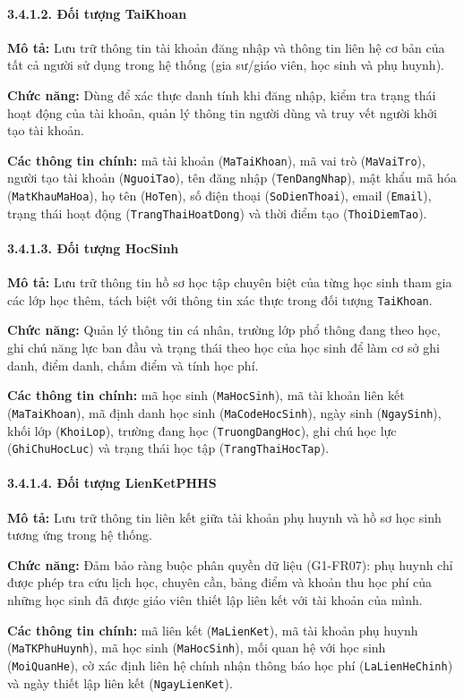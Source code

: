\paragraph{3.4.1.2. Đối tượng TaiKhoan}\mbox{}\par
\textbf{Mô tả:} Lưu trữ thông tin tài khoản đăng nhập và thông tin liên hệ cơ bản của tất cả người sử dụng trong hệ thống (gia sư/giáo viên, học sinh và phụ huynh).\par
\textbf{Chức năng:} Dùng để xác thực danh tính khi đăng nhập, kiểm tra trạng thái hoạt động của tài khoản, quản lý thông tin người dùng và truy vết người khởi tạo tài khoản.\par
\textbf{Các thông tin chính:} mã tài khoản (\texttt{MaTaiKhoan}), mã vai trò (\texttt{MaVaiTro}), người tạo tài khoản (\texttt{NguoiTao}), tên đăng nhập (\texttt{TenDangNhap}), mật khẩu mã hóa (\texttt{MatKhauMaHoa}), họ tên (\texttt{HoTen}), số điện thoại (\texttt{SoDienThoai}), email (\texttt{Email}), trạng thái hoạt động (\texttt{TrangThaiHoatDong}) và thời điểm tạo (\texttt{ThoiDiemTao}).

\paragraph{3.4.1.3. Đối tượng HocSinh}\mbox{}\par
\textbf{Mô tả:} Lưu trữ thông tin hồ sơ học tập chuyên biệt của từng học sinh tham gia các lớp học thêm, tách biệt với thông tin xác thực trong đối tượng \texttt{TaiKhoan}.\par
\textbf{Chức năng:} Quản lý thông tin cá nhân, trường lớp phổ thông đang theo học, ghi chú năng lực ban đầu và trạng thái theo học của học sinh để làm cơ sở ghi danh, điểm danh, chấm điểm và tính học phí.\par
\textbf{Các thông tin chính:} mã học sinh (\texttt{MaHocSinh}), mã tài khoản liên kết (\texttt{MaTaiKhoan}), mã định danh học sinh (\texttt{MaCodeHocSinh}), ngày sinh (\texttt{NgaySinh}), khối lớp (\texttt{KhoiLop}), trường đang học (\texttt{TruongDangHoc}), ghi chú học lực (\texttt{GhiChuHocLuc}) và trạng thái học tập (\texttt{TrangThaiHocTap}).

\paragraph{3.4.1.4. Đối tượng LienKetPHHS}\mbox{}\par
\textbf{Mô tả:} Lưu trữ thông tin liên kết giữa tài khoản phụ huynh và hồ sơ học sinh tương ứng trong hệ thống.\par
\textbf{Chức năng:} Đảm bảo ràng buộc phân quyền dữ liệu (G1-FR07): phụ huynh chỉ được phép tra cứu lịch học, chuyên cần, bảng điểm và khoản thu học phí của những học sinh đã được giáo viên thiết lập liên kết với tài khoản của mình.\par
\textbf{Các thông tin chính:} mã liên kết (\texttt{MaLienKet}), mã tài khoản phụ huynh (\texttt{MaTKPhuHuynh}), mã học sinh (\texttt{MaHocSinh}), mối quan hệ với học sinh (\texttt{MoiQuanHe}), cờ xác định liên hệ chính nhận thông báo học phí (\texttt{LaLienHeChinh}) và ngày thiết lập liên kết (\texttt{NgayLienKet}).

